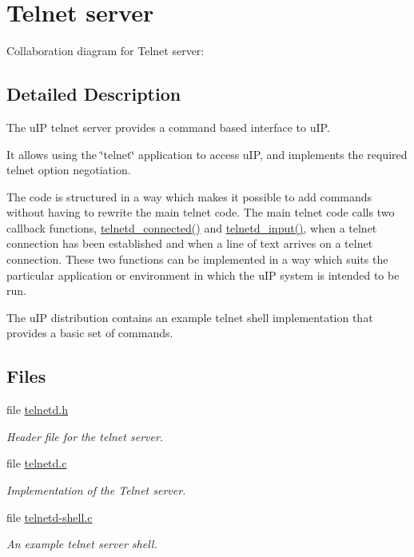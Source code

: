 \hypertarget{a00081}{
\section{Telnet server}
\label{a00081}
}


Collaboration diagram for Telnet server:

\subsection{Detailed Description}
The u\-IP telnet server provides a command based interface to u\-IP. 

It allows using the \char`\"{}telnet\char`\"{} application to access u\-IP, and implements the required telnet option negotiation.

The code is structured in a way which makes it possible to add commands without having to rewrite the main telnet code. The main telnet code calls two callback functions, \hyperlink{a00081_g992adc34dbe12cd28c2e5cc4c043b461}{telnetd\_\-connected()} and \hyperlink{a00081_ge639174c3eb987213a3ff0b1e138da26}{telnetd\_\-input()}, when a telnet connection has been established and when a line of text arrives on a telnet connection. These two functions can be implemented in a way which suits the particular application or environment in which the u\-IP system is intended to be run.

The u\-IP distribution contains an example telnet shell implementation that provides a basic set of commands. 

\subsection*{Files}
\begin{CompactItemize}
\item 
file \hyperlink{a00047}{telnetd.h}
\begin{CompactList}\small\item\em Header file for the telnet server. \item\end{CompactList}

\item 
file \hyperlink{a00046}{telnetd.c}
\begin{CompactList}\small\item\em Implementation of the Telnet server. \item\end{CompactList}

\item 
file \hyperlink{a00045}{telnetd-shell.c}
\begin{CompactList}\small\item\em An example telnet server shell. \item\end{CompactList}

\end{CompactItemize}
